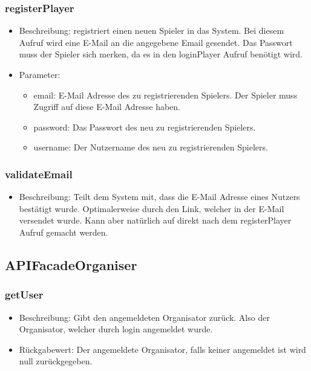 \documentclass[a4paper]{scrreprt}
\begin{document}
    \subsubsection{registerPlayer}
    \begin{itemize}
        \item Beschreibung: registriert einen neuen Spieler in das System. Bei diesem Aufruf wird eine E-Mail an die angegebene Email gesendet. Das Passwort muss der Spieler sich merken, da es in den loginPlayer Aufruf benötigt wird.
        \item Parameter:
        \begin{itemize}
            \item email: E-Mail Adresse des zu registrierenden Spielers. Der Spieler muss Zugriff auf diese E-Mail Adresse haben.
            \item password: Das Passwort des neu zu registrierenden Spielers.
            \item username: Der Nutzername des neu zu registrierenden Spielers.
        \end{itemize}
    \end{itemize}
    \subsubsection{validateEmail}
    \begin{itemize}
        \item Beschreibung: Teilt dem System mit, dass die E-Mail Adresse eines Nutzers bestätigt wurde. Optimalerweise durch den Link, welcher in der E-Mail versendet wurde. Kann aber natürlich auf direkt nach dem registerPlayer Aufruf gemacht werden.
    \end{itemize}
    \subsection{APIFacadeOrganiser}
    \subsubsection{getUser}
    \begin{itemize}
        \item Beschreibung: Gibt den angemeldeten Organisator zurück. Also der Organisator, welcher durch login angemeldet wurde.
        \item Rückgabewert: Der angemeldete Organisator, falls keiner angemeldet ist wird null zurückgegeben.
    \end{itemize}
\end{document}
